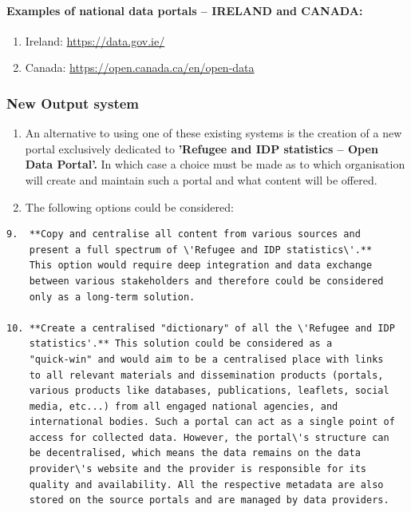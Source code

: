 \documentclass[
]{article}
\begin{document}
\hypertarget{examples-of-national-data-portals-ireland-and-canada}{%
\paragraph{Examples of national data portals -- IRELAND and CANADA:}\label{examples-of-national-data-portals-ireland-and-canada}}

\begin{enumerate}
\def\labelenumi{\roman{enumi}.}
\item
  Ireland: \url{https://data.gov.ie/}
\item
  Canada: \url{https://open.canada.ca/en/open-data}
\end{enumerate}

\hypertarget{new-output-system}{%
\subsubsection{New Output system}\label{new-output-system}}

\begin{enumerate}
\def\labelenumi{\arabic{enumi}.}
\setcounter{enumi}{504}
\item
  An alternative to using one of these existing systems is the
  creation of a new portal exclusively dedicated to \textbf{'Refugee and
  IDP statistics -- Open Data Portal'.} In which case a choice must
  be made as to which organisation will create and maintain such a
  portal and what content will be offered.
\item
  The following options could be considered:
\end{enumerate}

\begin{verbatim}
9.  **Copy and centralise all content from various sources and
    present a full spectrum of \'Refugee and IDP statistics\'.**
    This option would require deep integration and data exchange
    between various stakeholders and therefore could be considered
    only as a long-term solution.

10. **Create a centralised "dictionary" of all the \'Refugee and IDP
    statistics'.** This solution could be considered as a
    "quick-win" and would aim to be a centralised place with links
    to all relevant materials and dissemination products (portals,
    various products like databases, publications, leaflets, social
    media, etc...) from all engaged national agencies, and
    international bodies. Such a portal can act as a single point of
    access for collected data. However, the portal\'s structure can
    be decentralised, which means the data remains on the data
    provider\'s website and the provider is responsible for its
    quality and availability. All the respective metadata are also
    stored on the source portals and are managed by data providers.
\end{verbatim}
\end{document}
